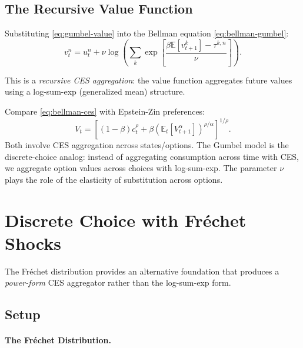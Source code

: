 \subsection{The Recursive Value Function}

Substituting \eqref{eq:gumbel-value} into the Bellman equation \eqref{eq:bellman-gumbel}:
\begin{equation}
\label{eq:bellman-ces}
\boxed{v_t^n = u_t^n + \nu \log \left( \sum_k \exp\left[ \frac{\beta \mathbb{E}[v_{t+1}^k] - \tau^{k,n}}{\nu} \right] \right).}
\end{equation}

This is a \emph{recursive CES aggregation}: the value function aggregates future values using a log-sum-exp (generalized mean) structure.

\begin{calloutnote}
Compare \eqref{eq:bellman-ces} with Epstein-Zin preferences:
\begin{equation}
V_t = \left[ (1-\beta) c_t^\rho + \beta \left( \mathbb{E}_t[V_{t+1}^\alpha] \right)^{\rho/\alpha} \right]^{1/\rho}.
\end{equation}
Both involve CES aggregation across states/options. The Gumbel model is the discrete-choice analog: instead of aggregating consumption across time with CES, we aggregate option values across choices with log-sum-exp. The parameter $\nu$ plays the role of the elasticity of substitution across options.
\end{calloutnote}

\section{Discrete Choice with Fréchet Shocks}
\label{sec:frechet}

The Fréchet distribution provides an alternative foundation that produces a \emph{power-form} CES aggregator rather than the log-sum-exp form.

\subsection{Setup}

\paragraph{The Fréchet Distribution.}

